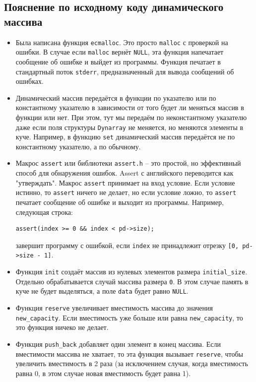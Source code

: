 \documentclass{article}
\begin{document}
\newpage
\subsection*{Пояснение по исходному коду динамического массива}

\begin{itemize}
\item Была написана функция \texttt{ecmalloc}. Это просто \texttt{malloc} с проверкой на ошибки. В случае если \texttt{malloc} вернёт \texttt{NULL}, эта функция напечатает сообщение об ошибке и выйдет из программы. Функция печатает в стандартный поток \texttt{stderr}, предназначенный для вывода сообщений об ошибках.

\item Динамический массив передаётся в функции по указателю или по константному указателю в зависимости от того будет ли меняться массив в функции или нет. При этом, тут мы передаём по неконстантному указателю даже если поля структуры \texttt{Dynarray} не меняется, но меняются элементы в куче. Например, в функцию \texttt{set} динамический массив передаётся не по константному указателю, а по обычному.

\item Макрос \texttt{assert} или библиотеки \texttt{assert.h} -- это простой, но эффективный способ для обнаружения ошибок. Assert с английского переводится как "утверждать". Макрос \texttt{assert} принимает на вход условие. Если условие истинно, то \texttt{assert} ничего не делает, но если условие ложно, то \texttt{assert} печатает сообщение об ошибке и выходит из программы. Например, следующая строка:
\begin{lstlisting}
assert(index >= 0 && index < pd->size);
\end{lstlisting}
завершит программу с ошибкой, если \texttt{index} не принадлежит отрезку \texttt{[0, pd->size - 1]}.


\item Функция \texttt{init} создаёт массив из нулевых элементов размера \texttt{initial\_size}. Отдельно обрабатывается случай массива размера \texttt{0}. В этом случае память в куче не будет выделяться, а поле \texttt{data} будет равно \texttt{NULL}.

\item Функция \texttt{reserve} увеличивает вместимость массива до значения \texttt{new\_capacity}. Если вместимость уже больше или равна \texttt{new\_capacity}, то это функция ничеко не делает.

\item Функция \texttt{push\_back} добавляет один элемент в конец массива. Если вместимости массива не хватает, то эта функция вызывает \texttt{reserve}, чтобы увеличить вместимость в 2 раза (за исключением случая, когда вместимость равна 0, в этом случае новая вместимость будет равна 1). 
\end{itemize}
\end{document}
